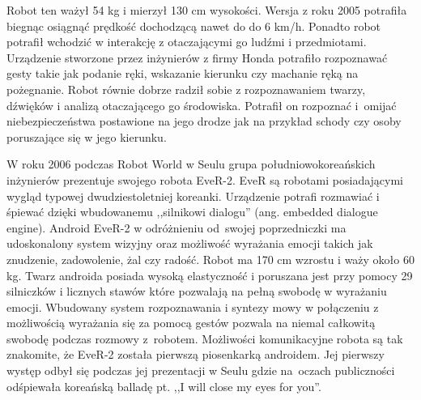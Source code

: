 Robot ten ważył 54 kg i mierzył 130 cm wysokości. Wersja z roku 2005 potrafiła
biegnąc osiągnąć prędkość dochodzącą nawet do do 6 km/h. Ponadto robot potrafił
wchodzić w interakcję z otaczającymi go ludźmi i przedmiotami. Urządzenie
stworzone przez inżynierów z firmy Honda potrafiło rozpoznawać gesty takie jak
podanie ręki, wskazanie kierunku czy machanie ręką na pożegnanie. Robot równie
dobrze radził sobie z rozpoznawaniem twarzy, dźwięków i analizą otaczającego go
środowiska. Potrafił on rozpoznać i~omijać niebezpieczeństwa postawione na jego
drodze jak na przykład schody czy osoby poruszające się w jego kierunku.

W roku 2006 podczas Robot World w Seulu grupa południowokoreańskich inżynierów
prezentuje swojego robota EveR-2. EveR są robotami posiadającymi wygląd typowej
dwudziestoletniej koreanki. Urządzenie potrafi rozmawiać i śpiewać dzięki
wbudowanemu ,,silnikowi dialogu'' (ang. embedded dialogue engine). Android EveR-2
w odróżnieniu od~swojej poprzedniczki ma udoskonalony system wizyjny oraz
możliwość wyrażania emocji takich jak znudzenie, zadowolenie, żal czy radość.
Robot ma 170 cm wzrostu i waży około 60 kg. Twarz androida posiada wysoką
elastyczność i poruszana jest przy pomocy 29 silniczków i licznych stawów które
pozwalają na pełną swobodę w wyrażaniu emocji. Wbudowany system rozpoznawania i
syntezy mowy w połączeniu z możliwością wyrażania się za pomocą gestów pozwala na
niemal całkowitą swobodę podczas rozmowy z~robotem. Możliwości komunikacyjne
robota są tak znakomite, że EveR-2 została pierwszą piosenkarką androidem. Jej
pierwszy występ odbył się podczas jej prezentacji w Seulu gdzie na~oczach
publiczności odśpiewała koreańską balladę pt. ,,I will close my eyes for you''.


